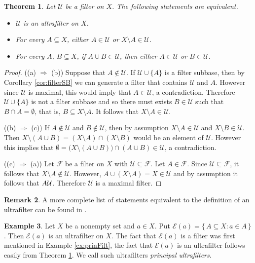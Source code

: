 \documentclass[12pt]{article}
\theoremstyle{plain}
\newtheorem{thm}{Theorem}[section]
\theoremstyle{definition}
\newtheorem{rmk}[thm]{Remark}
\newtheorem{example}[thm]{Example}
\newcommand{\calE}{\mathcal{E}}
\newcommand{\calF}{\mathcal{F}}
\newcommand{\calU}{\mathcal{U}}
\begin{document}
\begin{thm}
  \label{thm:equf}
  Let $\calU$ be a filter on $X$.
  The following statements are equivalent.
  \begin{itemize}
    \item[(a)] $\calU$ is an ultrafilter on $X$.
    \item[(b)] For every $A \subseteq X$, either $A \in \calU$ or $X
      \setminus A \in \calU$.
    \item[(c)] For every $A$, $B \subseteq X$, if $A \cup B \in
      \calU$, then either $A \in \calU$ or $B \in \calU$.
  \end{itemize}
\end{thm}
\begin{proof}
  ((a) $\Rightarrow$ (b))
  Suppose that $A \not\in \calU$.
  If $\calU \cup \{A\}$ is a filter subbase, then by Corollary
  \ref{cor:filterSB} we can generate a filter that contains $\calU$
  and $A$.
  However since $\calU$ is maximal, this would imply that $A \in
  \calU$, a contradiction.
  Therefore $\calU \cup \{A\}$ is not a filter subbase and so there
  must exists $B \in \calU$ such that $B \cap A = \emptyset$, that is,
  $B \subseteq X \setminus A$.
  It follows that $X \setminus A \in \calU$.
  
  ((b) $\Rightarrow$ (c))
  If $A \not\in \calU$ and $B \not\in \calU$, then by assumption $X
  \setminus A \in \calU$ and $X \setminus B \in \calU$.
  Then $X \setminus (A \cup B) = (X \setminus A) \cap (X \setminus B)$
  would be an element of $\calU$.
  However this implies that $\emptyset = \bigl(X \setminus (A \cup
  B)\bigr) \cap (A \cup B) \in \calU$, a contradiction.

  ((c) $\Rightarrow$ (a))
  Let $\calF$ be a filter on $X$ with $\calU \subseteq \calF$.
  Let $A \in \calF$.
  Since $\calU \subseteq \calF$, it follows that $X \setminus A
  \not\in \calU$.
  However, $A \cup (X \setminus A) = X \in \calU$ and by assumption it
  follows that $A \cal \calU$.
  Therefore $\calU$ is a maximal filter.
\end{proof}
\begin{rmk}
  A more complete list of statements equivalent to the definition of
  an ultrafilter can be found in \cite[Theorem 3.6]{Hindman:1998fk}.
\end{rmk}

\begin{example}
  Let $X$ be a nonempty set and $a \in X$.
  Put $\calE(a) = \{\, A \subseteq X : a \in A \,\}$.
  Then $\calE(a)$ is an ultrafilter on $X$.
  The fact that $\calE(a)$ is a filter was first mentioned in Example
  \ref{ex:prinFilt}, the fact that $\calE(a)$ is an ultrafilter
  follows easily from Theorem \ref{thm:equf}.
  We call such ultrafilters \textsl{principal ultrafilters}.
\end{example}
\end{document}
